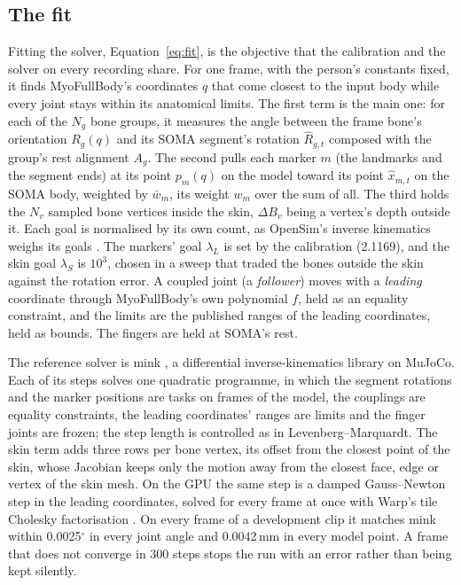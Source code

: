 \documentclass[11pt]{article}
\newcommand{\dg}{\ensuremath{^\circ}}
\begin{document}
\subsection{The fit}
\label{sec:fit}

Fitting the solver, Equation~\eqref{eq:fit}, is the objective that the calibration and the solver on every recording
share. For one frame, with the person's constants fixed, it finds MyoFullBody's coordinates $q$
that come closest to the input body while every joint stays within its anatomical limits.
The first term is the main one: for each of the $N_g$ bone groups, it measures the angle between the frame bone's
orientation $R_g(q)$ and its SOMA segment's rotation $\hat R_{g,t}$ composed with the group's rest alignment $A_g$. The second
pulls each marker $m$ (the landmarks and the segment ends) at its point $p_m(q)$ on the model toward its point $\hat
x_{m,t}$ on the SOMA body, weighted by $\bar w_m$, its weight $w_m$ over the sum of all. The third holds the $N_v$ sampled bone
vertices inside the skin, $\Delta B_v$ being a vertex's depth outside it. Each goal is normalised by its own count, as OpenSim's inverse kinematics weighs its goals
\cite{seth2018opensim}. The markers' goal $\lambda_L$ is set by the calibration (2.1169), and the skin goal
$\lambda_S$ is $10^3$, chosen in a sweep that traded the bones outside the skin against the rotation error. A coupled
joint (a \emph{follower}) moves with a \emph{leading} coordinate through MyoFullBody's own polynomial $f$, held as an
equality constraint, and the limits are the published ranges of the leading coordinates, held as bounds. The fingers
are held at SOMA's rest.

The reference solver is mink \cite{mink}, a differential inverse-kinematics library on MuJoCo. Each of its steps
solves one quadratic programme, in which the segment rotations and the marker positions are tasks on frames of the
model, the couplings are equality constraints, the leading coordinates' ranges are limits and the finger joints are
frozen; the step length is controlled as in Levenberg--Marquardt. The skin term adds three rows per bone vertex, its
offset from the closest point of the skin, whose Jacobian keeps only the motion away from the closest face, edge or
vertex of the skin mesh. On the GPU the same step is a damped Gauss--Newton step in the leading coordinates, solved for
every frame at once with Warp's tile Cholesky factorisation \cite{warp}. On every frame of a development clip it
matches mink within 0.0025\dg{} in every joint angle and 0.0042\,mm in every model point. A frame that does not
converge in 300 steps stops the run with an error rather than being kept silently.
\end{document}
